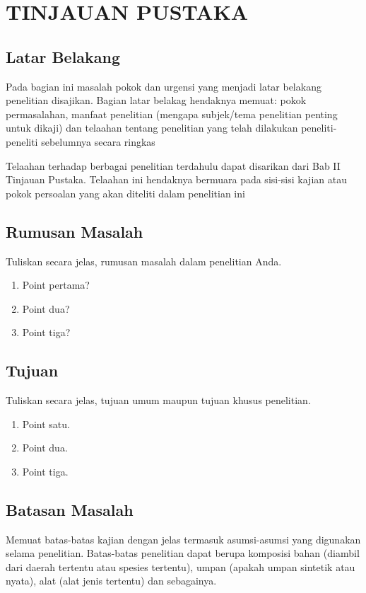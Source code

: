 \chapter{TINJAUAN PUSTAKA}
\section{Latar Belakang}
Pada bagian ini masalah pokok dan urgensi yang menjadi latar belakang penelitian disajikan. Bagian latar belakag hendaknya memuat: pokok permasalahan, manfaat penelitian (mengapa subjek/tema penelitian penting untuk dikaji) dan telaahan tentang penelitian yang telah dilakukan peneliti-peneliti sebelumnya secara ringkas \cite{muthiahPerformanceEvaluationHadoopa}

Telaahan terhadap berbagai penelitian terdahulu dapat disarikan dari Bab II Tinjauan Pustaka. Telaahan ini hendaknya bermuara pada sisi-sisi kajian atau pokok persoalan yang akan diteliti dalam penelitian ini

\section{Rumusan Masalah}
Tuliskan secara jelas, rumusan masalah dalam penelitian Anda.
\begin{enumerate}{\tiny }
	\item 
	Point pertama?
	\item
	Point dua?
	\item
	Point tiga?
\end{enumerate}
\section{Tujuan}
Tuliskan secara jelas, tujuan umum maupun tujuan khusus penelitian.
\begin{enumerate}
	\item 
	Point satu.
	\item
	Point dua.
	\item
	Point tiga.
\end{enumerate}
\section{Batasan Masalah}
Memuat batas-batas kajian dengan jelas termasuk asumsi-asumsi yang digunakan selama penelitian. Batas-batas penelitian dapat berupa komposisi bahan (diambil dari daerah tertentu atau spesies tertentu), umpan (apakah umpan sintetik atau nyata), alat (alat jenis tertentu) dan sebagainya.